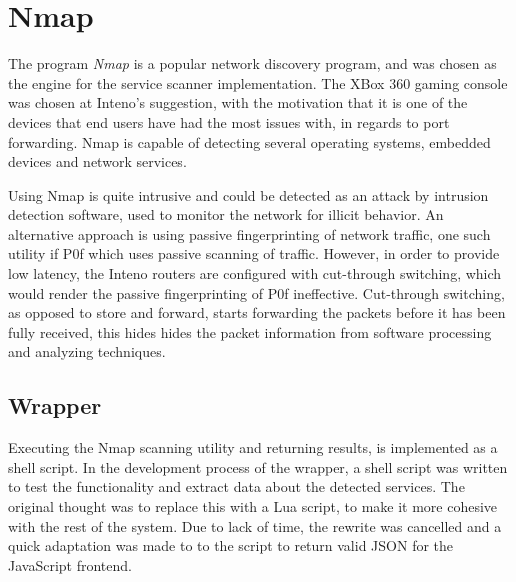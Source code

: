 \documentclass[a4paper,11pt,makeidx]{kth-bcs}
\begin{document}

\section{Nmap}
The program \emph{Nmap} is a popular network discovery program, and was chosen as the engine for the service scanner implementation.
The XBox 360 gaming console was chosen at Inteno's suggestion, with the motivation that it is one of the devices that end users have had the most issues with, in regards to port forwarding.
Nmap is capable of detecting several operating systems, embedded devices and network services.

Using Nmap is quite intrusive and could be detected as an attack by intrusion detection software, used to monitor the network for illicit behavior.
An alternative approach is using passive fingerprinting of network traffic, one such utility if P0f which uses passive scanning of traffic.\cite{p0f}
However, in order to provide low latency, the Inteno routers are configured with cut-through switching, which would render the passive fingerprinting of P0f ineffective.
Cut-through switching, as opposed to store and forward, starts forwarding the packets before it has been fully received, this hides hides the packet information from software processing and analyzing techniques.

\subsection{Wrapper}
Executing the Nmap scanning utility and returning results, is implemented as a shell script.
In the development process of the wrapper, a shell script was written to test the functionality and extract data about the detected services.
The original thought was to replace this with a Lua script, to make it more cohesive with the rest of the system.
Due to lack of time, the rewrite was cancelled and a quick adaptation was made to to the script to return valid JSON for the JavaScript frontend.
\end{document}
